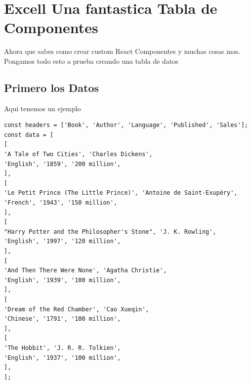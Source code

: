 \chapter{Excell Una fantastica Tabla de Componentes}
Ahora que sabes como crear custom React Componentes y muchas cosas mas. Pongamos todo esto a prueba creando una tabla de datos\\
\section{Primero los Datos}
Aqui tenemos un ejemplo
\begin{lstlisting}[language=html]
const headers = ['Book', 'Author', 'Language', 'Published', 'Sales'];
const data = [
[
'A Tale of Two Cities', 'Charles Dickens',
'English', '1859', '200 million',
],
[
'Le Petit Prince (The Little Prince)', 'Antoine de Saint-Exupéry',
'French', '1943', '150 million',
],
[
"Harry Potter and the Philosopher's Stone", 'J. K. Rowling',
'English', '1997', '120 million',
],
[
'And Then There Were None', 'Agatha Christie',
'English', '1939', '100 million',
],
[
'Dream of the Red Chamber', 'Cao Xueqin',
'Chinese', '1791', '100 million',
],
[
'The Hobbit', 'J. R. R. Tolkien',
'English', '1937', '100 million',
],
];
\end{lstlisting}
